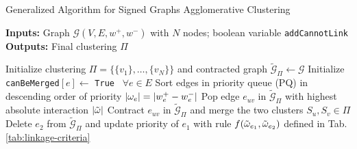 \begin{algorithm}[t]
  \caption{Generalized Algorithm for Signed Graphs Agglomerative Clustering}
   \hspace*{\algorithmicindent} \textbf{Inputs:} Graph $\mathcal{G}(V,E,w^+,w^-)$ with $N$ nodes; boolean variable {\color{blue}\texttt{addCannotLink}}  \\
  \hspace*{\algorithmicindent} \textbf{Outputs:} Final clustering $\Pi$\\
  \hspace*{\algorithmicindent} 
  \begin{algorithmic}[1]
      \State Initialize clustering $\Pi=\{\{v_1\}, \ldots, \{v_N\}\}$ and contracted graph $\tilde{\mathcal{G}}_\Pi \gets \mathcal{G}$
      \State Initialize \texttt{canBeMerged}$[e] \gets$ \texttt{True} $\,\,\, \forall e\in E$
      \State Sort edges in priority queue (PQ) in descending order of priority $|\omega_e|=|w^+_e - w^-_e|$ 
      \State
        \State Pop edge $e_{uv}$ in $\tilde{\mathcal{G}}_\Pi$ with highest absolute interaction $|\tilde{\omega}|$
          \State Contract $e_{uv}$ in $\tilde{\mathcal{G}}_\Pi$ and merge the two clusters $S_u,S_v \in \Pi$
            \State Delete $e_2$ from $\tilde{\mathcal{G}}_\Pi$ and update priority of $e_1$ with rule $f(\tilde{\omega}_{e_1},\tilde{\omega}_{e_2})$ defined in Tab. \ref{tab:linkage-criteria} 
          \EndFor

\end{algorithmic}
\end{algorithm}
